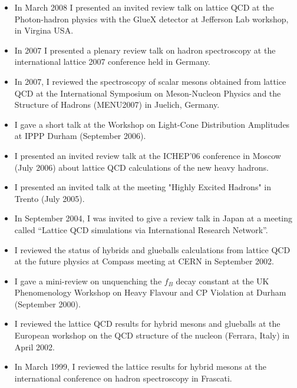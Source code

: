 \documentclass[12pt]{article}
\begin{document}
\begin{itemize}
\item In March
2008 I presented an invited review talk on lattice QCD at the
Photon-hadron physics with the GlueX detector at Jefferson Lab
workshop, in Virgina USA. 

\item In 2007 I presented a plenary review talk on hadron spectroscopy 
      at the international lattice 2007 conference held in
      Germany. 

\item  In
2007, I reviewed the spectroscopy of scalar mesons obtained from
lattice QCD at the International Symposium on Meson-Nucleon Physics
and the Structure of Hadrons (MENU2007) in Juelich, Germany.  

\item I gave a short talk at the Workshop on
Light-Cone Distribution Amplitudes at IPPP Durham (September 2006).

\item I presented an invited review talk at the ICHEP'06 conference
in Moscow (July 2006) about lattice QCD calculations of the 
new heavy hadrons.

\item I presented an
     invited talk at the meeting "Highly Excited Hadrons" in Trento (July
      2005). 

\item In September 2004, I was
invited to give a review talk in Japan at a meeting called ``Lattice
QCD simulations via International Research Network''.  

\item I reviewed the status of hybrids
and glueballs calculations from lattice QCD at the future physics at
Compass meeting at CERN in September 2002.  

\item I gave a mini-review on unquenching the $f_B$
decay constant at the UK Phenomenology Workshop on Heavy Flavour and
CP Violation at Durham (September 2000). 

\item I
reviewed the lattice QCD results for hybrid mesons and glueballs at
the European workshop on the QCD structure of the nucleon (Ferrara,
Italy) in April 2002.  

\item In March 1999, I reviewed the lattice results for hybrid mesons at the
international conference on hadron spectroscopy in Frascati.  

\end{itemize}
\end{document}
